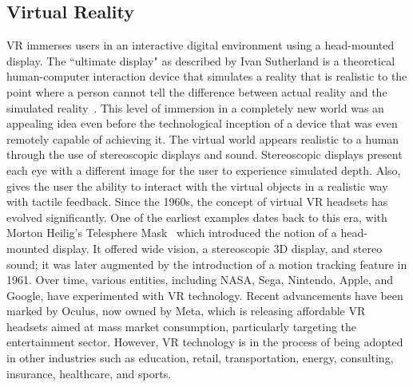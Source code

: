 \subsection{Virtual Reality}
\label{sec:virtual-reality}
VR immerses users in an interactive digital environment using a head-mounted display.
The ``ultimate display" as described by Ivan Sutherland is a theoretical human-computer interaction device that simulates a reality that is realistic to the point where a person cannot tell the difference between actual reality and the simulated reality~\cite{Sutherland1965}.
This level of immersion in a completely new world was an appealing idea even before the technological inception of a device that was even remotely capable of achieving it.
The virtual world appears realistic to a human through the use of stereoscopic displays and sound.
Stereoscopic displays present each eye with a different image for the user to experience simulated depth.
Also, gives the user the ability to interact with the virtual objects in a realistic way with tactile feedback.
Since the 1960s, the concept of virtual VR headsets has evolved significantly. 
One of the earliest examples dates back to this era, with Morton Heilig's Telesphere Mask~\cite{Heilig1994} which introduced the notion of a head-mounted display. 
It offered wide vision, a stereoscopic 3D display, and stereo sound; it was later augmented by the introduction of a motion tracking feature in 1961.
Over time, various entities, including NASA, Sega, Nintendo, Apple, and Google, have experimented with VR technology. 
Recent advancements have been marked by Oculus, now owned by Meta, which is releasing affordable VR headsets aimed at mass market consumption, particularly targeting the entertainment sector.
However, VR technology is in the process of being adopted in other industries such as education, retail, transportation, energy, consulting, insurance, healthcare, and sports.

